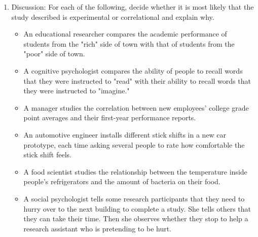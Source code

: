 \begin{fullwidth}

\begin{enumerate}

\item  Discussion: For each of the following, decide whether it is most likely that the study described is experimental or correlational and explain why.



\begin{itemize}


\item  An educational researcher compares the academic performance of students from the "rich" side of town with that of students from the "poor" side of town.



\item A cognitive psychologist compares the ability of people to recall words that they were instructed to "read" with their ability to recall words that they were instructed to "imagine."



\item A manager studies the correlation between new employees' college grade point averages and their first-year performance reports.



\item An automotive engineer installs different stick shifts in a new car prototype, each time asking several people to rate how comfortable the stick shift feels.



\item A food scientist studies the relationship between the temperature inside people's refrigerators and the amount of bacteria on their food.



\item A social psychologist tells some research participants that they need to hurry over to the next building to complete a study. She tells others that they can take their time. Then she observes whether they stop to help a research assistant who is pretending to be hurt.


\end{itemize}

\end{enumerate}

\end{fullwidth}  


